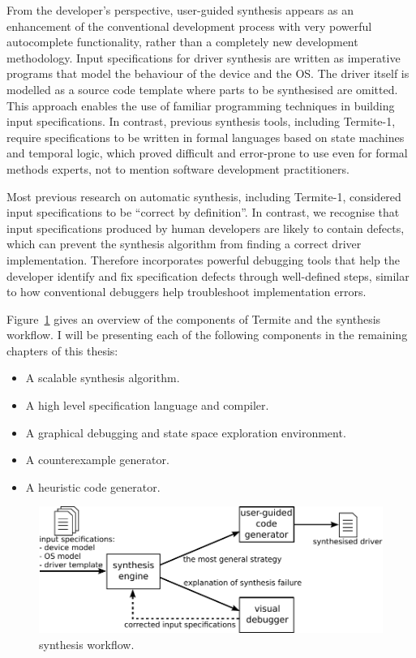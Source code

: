 From the developer's perspective, user-guided synthesis appears as an enhancement of the conventional development process with very powerful autocomplete functionality, rather than a completely new development methodology. Input specifications for driver synthesis are written as imperative programs that model the behaviour of the device and the OS\@.  The driver itself is modelled as a source code template where parts to be synthesised are omitted.  This approach enables the use of familiar programming techniques in building input specifications.  In contrast, previous synthesis tools, including Termite-1, require specifications to be written in formal languages based on state machines and temporal logic, which proved difficult and error-prone to use even for formal methods experts, not to mention software development practitioners.

Most previous research on automatic synthesis, including Termite-1, considered input specifications to be ``correct by definition''.  In contrast, we recognise that input specifications produced by human developers are likely to contain defects, which can prevent the synthesis algorithm from finding a correct driver implementation.  Therefore \termite incorporates powerful debugging tools that help the developer identify and fix specification defects through well-defined steps, similar to how conventional debuggers help troubleshoot implementation errors.

Figure~\ref{f:termite_intro} gives an overview of the components of Termite and the synthesis workflow. I will be presenting each of the following components in the remaining chapters of this thesis:
\begin{itemize}
    \item A scalable synthesis algorithm.
    \item A high level specification language and compiler.
    \item A graphical debugging and state space exploration environment.
    \item A counterexample generator.
    \item A heuristic code generator.
\end{itemize}

\begin{figure}
    \center
    \includegraphics[width=\linewidth]{imgs/termite.pdf}
    \caption{\termite synthesis workflow.}\label{f:termite_intro}
\end{figure}

